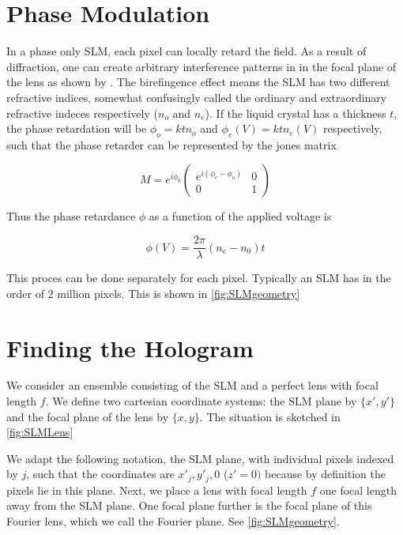 \section{Phase Modulation}

In a phase only \ac{SLM}, each pixel can locally retard the field. As a result of diffraction, one can create arbitrary interference patterns in in the focal plane of the lens as shown by \cite{Bijnen2013}. The birefingence effect means the \ac{SLM} has two different refractive indices, somewhat confusingly called the ordinary and extraordinary refractive indeces respectively ($n_o$ and $n_e$). If the liquid crystal has a thickness $t$, the phase retardation will be $\phi_o = k t n_o$ and $\phi_e(V) = k t n_e(V)$ respectively, such that the phase retarder can be represented by the jones matrix

\begin{equation}\label{eq:JonesMatrix}
    M = e^{i \phi_0} 
    \begin{pmatrix}
        e^{i(\phi_e-\phi_o)} & 0\\
        0 & 1
    \end{pmatrix}
\end{equation}

Thus the phase retardance $\phi$ as a function of the applied voltage is

\begin{equation}
    \phi(V) = \frac{2\pi}{\lambda} (n_e - n_0) t
\end{equation}

This proces can be done separately for each pixel. Typically an SLM has in the order of 2 million pixels. This is shown in \cref{fig:SLMgeometry}





\section{Finding the Hologram}\label{sec:IFTA}

We consider an ensemble consisting of the SLM and a perfect lens with focal length $f$. We define two cartesian coordinate systems: the SLM plane by $\{x',y'\}$ and the focal plane of the lens by $\{x,y\}$. The situation is sketched in \cref{fig:SLMLens}

We adapt the following notation, the \ac{SLM} plane, with individual pixels indexed by $j$, such that the coordinates are $x'_j, y'_j,0$ ($z'=0)$ because by definition the pixels lie in this plane. Next, we place a lens with focal length $f$ one focal length away from the SLM plane. One focal plane further is the focal plane of this Fourier lens, which we call the Fourier plane. See \cref{fig:SLMgeometry}. 

